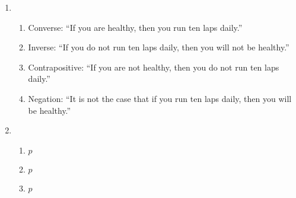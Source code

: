 \begin{enumerate}[leftmargin=2cm,labelsep=.5cm,label=\bf\arabic*.]
\item 
\begin{enumerate}
  \item Converse: ``If you are healthy, then you run ten laps daily.''
  \item Inverse: ``If you do not run ten laps daily, then you will not be healthy.''
  \item Contrapositive: ``If you are not healthy, then you do not run ten laps daily.''
  \item Negation: ``It is not the case that if you run ten laps daily, then you will be healthy.''\\[5mm]
\end{enumerate}

\item
  	\begin{enumerate}
  \item $p$
  \item $p$
  \item $p$
\end{enumerate}
 
\end{enumerate}